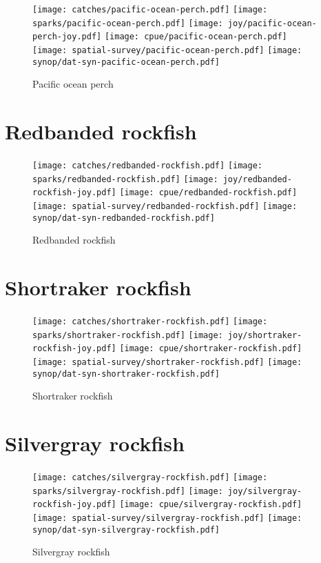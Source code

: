 \begin{figure}[htbp]
\centering
\texttt{[image: catches/pacific-ocean-perch.pdf]}
\texttt{[image: sparks/pacific-ocean-perch.pdf]}
\texttt{[image: joy/pacific-ocean-perch-joy.pdf]}
\texttt{[image: cpue/pacific-ocean-perch.pdf]}
\texttt{[image: spatial-survey/pacific-ocean-perch.pdf]}
\texttt{[image: synop/dat-syn-pacific-ocean-perch.pdf]}
\caption{Pacific ocean perch}
\end{figure}
\clearpage
\section*{Redbanded rockfish}

\begin{figure}[htbp]
\centering
\texttt{[image: catches/redbanded-rockfish.pdf]}
\texttt{[image: sparks/redbanded-rockfish.pdf]}
\texttt{[image: joy/redbanded-rockfish-joy.pdf]}
\texttt{[image: cpue/redbanded-rockfish.pdf]}
\texttt{[image: spatial-survey/redbanded-rockfish.pdf]}
\texttt{[image: synop/dat-syn-redbanded-rockfish.pdf]}
\caption{Redbanded rockfish}
\end{figure}
\clearpage
\section*{Shortraker rockfish}

\begin{figure}[htbp]
\centering
\texttt{[image: catches/shortraker-rockfish.pdf]}
\texttt{[image: sparks/shortraker-rockfish.pdf]}
\texttt{[image: joy/shortraker-rockfish-joy.pdf]}
\texttt{[image: cpue/shortraker-rockfish.pdf]}
\texttt{[image: spatial-survey/shortraker-rockfish.pdf]}
\texttt{[image: synop/dat-syn-shortraker-rockfish.pdf]}
\caption{Shortraker rockfish}
\end{figure}
\clearpage
\section*{Silvergray rockfish}

\begin{figure}[htbp]
\centering
\texttt{[image: catches/silvergray-rockfish.pdf]}
\texttt{[image: sparks/silvergray-rockfish.pdf]}
\texttt{[image: joy/silvergray-rockfish-joy.pdf]}
\texttt{[image: cpue/silvergray-rockfish.pdf]}
\texttt{[image: spatial-survey/silvergray-rockfish.pdf]}
\texttt{[image: synop/dat-syn-silvergray-rockfish.pdf]}
\caption{Silvergray rockfish}
\end{figure}
\clearpage
